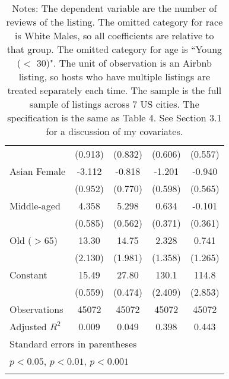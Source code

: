 {\begin{longtable}{l*{4}{c}}
                    &     (0.913)         &     (0.832)         &     (0.606)         &     (0.557)         \\
[1em]
Asian Female        &      -3.112\sym{**} &      -0.818         &      -1.201\sym{*}  &      -0.940         \\
                    &     (0.952)         &     (0.770)         &     (0.598)         &     (0.565)         \\
[1em]
Middle-aged         &       4.358\sym{***}&       5.298\sym{***}&       0.634         &      -0.101         \\
                    &     (0.585)         &     (0.562)         &     (0.371)         &     (0.361)         \\
[1em]
Old ($>$65)           &       13.30\sym{***}&       14.75\sym{***}&       2.328         &       0.741         \\
                    &     (2.130)         &     (1.981)         &     (1.358)         &     (1.265)         \\
[1em]
Constant            &       15.49\sym{***}&       27.80\sym{***}&       130.1\sym{***}&       114.8\sym{***}\\
                    &     (0.559)         &     (0.474)         &     (2.409)         &     (2.853)         \\
\hline
Observations        &       45072         &       45072         &       45072         &       45072         \\
Adjusted \(R^{2}\)  &       0.009         &       0.049         &       0.398         &       0.443         \\
\hline\hline
\multicolumn{5}{l}{\footnotesize Standard errors in parentheses}\\
\multicolumn{5}{l}{\footnotesize \sym{*} \(p<0.05\), \sym{**} \(p<0.01\), \sym{***} \(p<0.001\)}\\
\caption*{Notes: The dependent variable are the number of reviews of the listing. The omitted category for race is White Males, so all coefficients are relative to that group. The omitted category for age is ``Young ($<$ 30)". The unit of observation is an Airbnb listing, so hosts who have multiple listings are treated separately each time. The sample is the full sample of listings across 7 US cities. The specification is the same as Table 4. See Section 3.1 for a discussion of my covariates.}
\end{longtable}
}

